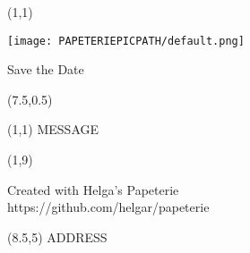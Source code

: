 \documentclass[a6paper,landscape]{scrartcl}
\begin{document}
\begin{textblock}{13}(1,1)
  \begin{center}
    \centering\texttt{[image: PAPETERIEPICPATH/default.png]}

    \vspace{0.5cm}

    {\huge\calligra Save the Date}
  \end{center}
\end{textblock}

\mbox{}\newpage

\pagebreak

\begin{textblock}{1}(7.5,0.5)
  {\vrule width 0.1ex height 95 mm}
\end{textblock}

\begin{textblock}{5.5}(1,1)
  MESSAGE
\end{textblock}

\begin{textblock}{5.5}(1,9)
{\color{grey}\tiny{} Created with Helga's Papeterie\\ https://github.com/helgar/papeterie \par }
\end{textblock}

\begin{textblock}{5.5}(8.5,5)
  ADDRESS
\end{textblock}
\end{document}
